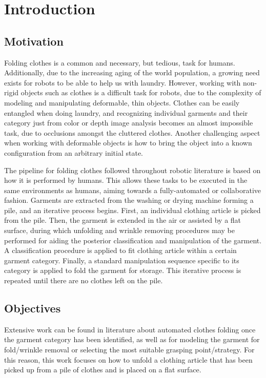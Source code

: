 \chapter{Introduction}
\label{introduction}

\section{Motivation}
\label{intro_motivation}
Folding clothes is a common and necessary, but tedious, task for humans. Additionally, due to the increasing aging of the world population, a growing need exists for robots to be able to help us with laundry.
However, working with non-rigid objects such as clothes is a difficult task for robots, due to the complexity of modeling and manipulating deformable, thin objects. Clothes can be easily entangled when doing laundry, and recognizing individual garments and their category just from color or depth image analysis becomes an almost impossible task, due to occlusions amongst the cluttered clothes. Another challenging aspect when working with deformable objects is how to bring the object into a known configuration from an arbitrary initial state.

The pipeline for folding clothes followed throughout robotic literature is based on how it is performed by humans. This allows these tasks to be executed in the same environments as humans, aiming towards a fully-automated or collaborative fashion. Garments are extracted from the washing or drying machine forming a pile, and an iterative process begins. First, an individual clothing article is picked from the pile. Then, the garment is extended in the air or assisted by a flat surface, during which unfolding and wrinkle removing procedures may be performed for aiding the posterior classification and manipulation of the garment. A classification procedure is applied to fit clothing article within a certain garment category. Finally, a standard manipulation sequence specific to its category is applied to fold the garment for storage. This iterative process is repeated until there are no clothes left on the pile.


\section{Objectives}
\label{intro_objectives}
Extensive work can be found in literature about automated clothes folding once the garment category has been identified, as well as for modeling the garment for fold/wrinkle removal or selecting the most suitable grasping point/strategy. For this reason, this work focuses on how to unfold a clothing article that has been picked up from a pile of clothes and is placed on a flat surface.

